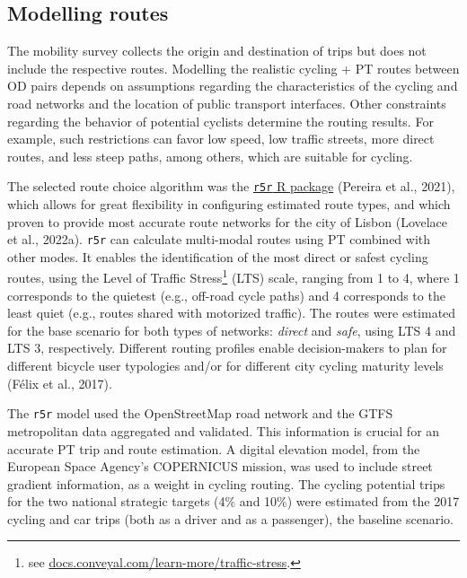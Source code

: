 \documentclass[review, doubleblind, 3p,
authoryear]{elsarticle} %
\begin{document}
\hypertarget{modelling-routes}{%
\subsection{Modelling routes}\label{modelling-routes}}

The mobility survey collects the origin and destination of trips but
does not include the respective routes. Modelling the realistic cycling
+ PT routes between OD pairs depends on assumptions regarding the
characteristics of the cycling and road networks and the location of
public transport interfaces. Other constraints regarding the behavior of
potential cyclists determine the routing results. For example, such
restrictions can favor low speed, low traffic streets, more direct
routes, and less steep paths, among others, which are suitable for
cycling.

The selected route choice algorithm was the
\href{https://ipeagit.github.io/r5r/}{\texttt{r5r} R package} (Pereira
et al., 2021), which allows for great flexibility in configuring
estimated route types, and which proven to provide most accurate route
networks for the city of Lisbon (Lovelace et al., 2022a). \texttt{r5r}
can calculate multi-modal routes using PT combined with other modes. It
enables the identification of the most direct or safest cycling routes,
using the Level of Traffic Stress\footnote{see
  \href{https://docs.conveyal.com/learn-more/traffic-stress}{docs.conveyal.com/learn-more/traffic-stress}.}
(LTS) scale, ranging from 1 to 4, where 1 corresponds to the quietest
(e.g., off-road cycle paths) and 4 corresponds to the least quiet (e.g.,
routes shared with motorized traffic). The routes were estimated for the
base scenario for both types of networks: \emph{direct} and \emph{safe},
using LTS 4 and LTS 3, respectively. Different routing profiles enable
decision-makers to plan for different bicycle user typologies and/or for
different city cycling maturity levels (Félix et al., 2017).

The \texttt{r5r} model used the OpenStreetMap road network and the GTFS
metropolitan data aggregated and validated. This information is crucial
for an accurate PT trip and route estimation. A digital elevation model,
from the European Space Agency's COPERNICUS mission, was used to include
street gradient information, as a weight in cycling routing. The cycling
potential trips for the two national strategic targets (4\% and 10\%)
were estimated from the 2017 cycling and car trips (both as a driver and
as a passenger), the baseline scenario.
\end{document}
